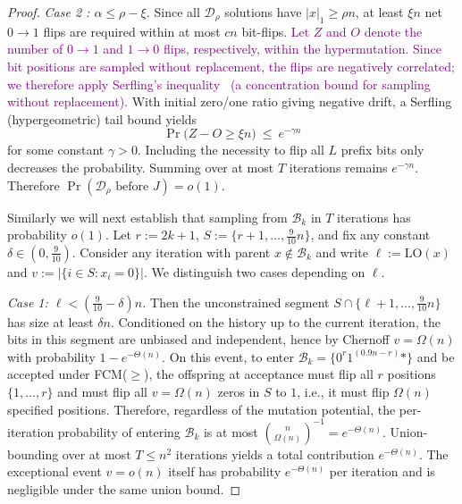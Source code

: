 \documentclass[lettersize,journal]{IEEEtran}
\newcommand{\rerev}[1]{\textcolor{purple}{#1}}
\begin{document}
{\begin{proof}
	\emph{Case 2 : $\alpha\le \rho-\xi$.}
	Since all $\mathcal{D}_\rho$ solutions have $|x|_1\ge \rho n$, at least $\xi n$ net $0\!\to\!1$ flips are required within at most
	$cn$ bit-flips. \rerev{Let $Z$ and $O$ denote the number of $0\!\to\!1$ and $1\!\to\!0$ flips, respectively, within the hypermutation. Since bit positions are sampled without replacement, the flips are negatively correlated; we therefore apply Serfling's inequality~\cite{serfling1974probability} (a concentration bound for sampling without replacement).} With initial zero/one ratio giving negative drift,
	a Serfling (hypergeometric) tail bound yields
	\[
	\Pr\bigl(Z-O\ge \xi n\bigr)\ \le\ e^{-\gamma n}
	\]
	for some constant $\gamma>0$. Including the necessity to flip all $L$ prefix bits only decreases the probability.
	Summing over at most $T$ iterations remains $e^{-\gamma n}$. Therefore $\Pr(\text{$\mathcal{D}_\rho$ before }J)=o(1)$.
	
	Similarly we will next establish that sampling from $\mathcal{B}_k$ in $T$ iterations  has probability $o(1)$.	Let $r:=2k{+}1$, $S:=\{r{+}1,\dots,\tfrac{9}{10}n\}$, and fix any constant
	$\delta\in(0,\tfrac{9}{10})$.  Consider any iteration with parent
	$x\notin\mathcal{B}_k$ and write $\ell:=\mathrm{LO}(x)$ and
	$v:=|\{i\in S:x_i=0\}|$.  We distinguish two cases depending on $\ell$.
	
	\emph{Case 1: $\ell < (\tfrac{9}{10}-\delta)n$.}
	Then the unconstrained segment
	$S\cap\{\ell{+}1,\dots,\tfrac{9}{10}n\}$ has size at least $\delta n$.
	Conditioned on the history up to the current iteration, the bits in this segment
	are unbiased and independent, hence by Chernoff $v=\Omega(n)$ with probability
	$1-e^{-\Theta(n)}$.  On this event, to enter
	$\mathcal{B}_k=\{0^{r}1^{(0.9n-r)}*\}$ and be accepted under FCM($\ge$), the
	offspring at acceptance must flip all $r$ positions $\{1,\dots,r\}$ and must flip
	all $v=\Omega(n)$ zeros in $S$ to $1$, i.e., it must flip $\Omega(n)$ specified
	positions.  Therefore, regardless of the mutation potential, the per-iteration
	probability of entering $\mathcal{B}_k$ is at most
	$\binom{n}{\Omega(n)}^{-1}=e^{-\Theta(n)}$.  Union-bounding over at most
	$T\le n^2$ iterations yields a total contribution $e^{-\Theta(n)}$.
	The exceptional event $v=o(n)$ itself has probability $e^{-\Theta(n)}$ per
	iteration and is negligible under the same union bound.
	

\end{proof}}
\end{document}
